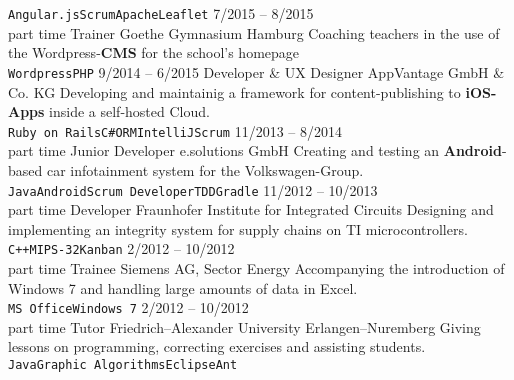 \documentclass[9pt]{developercv} %
\begin{document}
\begin{entrylist}
{      \texttt{Angular.js}\slashsep\texttt{Scrum}\slashsep\texttt{Apache}\slashsep\texttt{Leaflet}
    }
  \entry
		{7/2015 -- 8/2015\\\footnotesize{part time}}
		{Trainer}
		{Goethe Gymnasium Hamburg}
		{
      Coaching teachers in the use of the Wordpress-\textbf{CMS} for the school's homepage\\
      \texttt{Wordpress}\slashsep\texttt{PHP}
    }
  \entry
		{9/2014 -- 6/2015}
		{Developer \& UX Designer}
		{AppVantage GmbH \& Co. KG}
		{
      Developing and maintainig a framework for content-publishing to \textbf{iOS-Apps} inside a self-hosted Cloud.\\
      \texttt{Ruby on Rails}\slashsep\texttt{C\#}\slashsep\texttt{ORM}\slashsep\texttt{IntelliJ}\slashsep\texttt{Scrum}
    }
  \entry
		{11/2013 -- 8/2014\\\footnotesize{part time}}
		{Junior Developer}
		{e.solutions GmbH}
		{
      Creating and testing an \textbf{Android}-based car infotainment system for the Volkswagen-Group.\\
      \texttt{Java}\slashsep\texttt{Android}\slashsep\texttt{Scrum Developer}\slashsep\texttt{TDD}\slashsep\texttt{Gradle}
    }
  \entry
		{11/2012 -- 10/2013\\\footnotesize{part time}}
		{Developer}
		{Fraunhofer Institute for Integrated Circuits}
		{
      Designing and implementing an integrity system for supply chains on TI microcontrollers.\\
      \texttt{C++}\slashsep\texttt{MIPS-32}\slashsep\texttt{Kanban}
    }
  \entry
 		{2/2012 -- 10/2012\\\footnotesize{part time}}
 		{Trainee}
 		{Siemens AG, Sector Energy}
 		{
      Accompanying the introduction of Windows 7 and handling large amounts of data in Excel.\\
      \texttt{MS Office}\slashsep\texttt{Windows 7}
    }
  \entry
 		{2/2012 -- 10/2012\\\footnotesize{part time}}
 		{Tutor}
 		{Friedrich–Alexander University Erlangen–Nuremberg}
 		{
      Giving lessons on programming, correcting exercises and assisting students.\\
      \texttt{Java}\slashsep\texttt{Graphic Algorithms}\slashsep\texttt{Eclipse}\slashsep\texttt{Ant}
    }
\end{entrylist}


\end{document}
